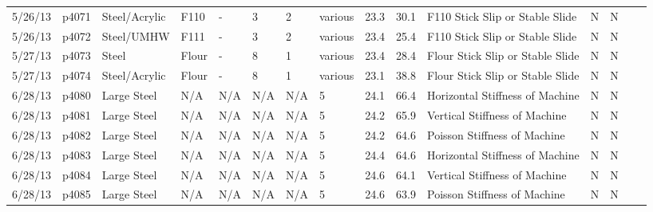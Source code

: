 \begin{landscape}
\begin{longtable}{lllllllllllllll}
5/26/13  & p4071      & Steel/Acrylic    & F110         & -            & 3         & 2             & various                      & 23.3        & 30.1     & F110 Stick Slip or Stable Slide                 & N     & N    &  &  \\
5/26/13  & p4072      & Steel/UMHW       & F111         & -            & 3         & 2             & various                      & 23.4        & 25.4     & F110 Stick Slip or Stable Slide                 & N     & N    &  &  \\
5/27/13  & p4073      & Steel            & Flour        & -            & 8         & 1             & various                      & 23.4        & 28.4     & Flour Stick Slip or Stable Slide                & N     & N    &  &  \\
5/27/13  & p4074      & Steel/Acrylic    & Flour        & -            & 8         & 1             & various                      & 23.1        & 38.8     & Flour Stick Slip or Stable Slide                & N     & N    &  &  \\
6/28/13  & p4080      & Large Steel      & N/A          & N/A          & N/A       & N/A           & 5                            & 24.1        & 66.4     & Horizontal Stiffness of Machine                 & N     & N    &  &  \\
6/28/13  & p4081      & Large Steel      & N/A          & N/A          & N/A       & N/A           & 5                            & 24.2        & 65.9     & Vertical Stiffness of Machine                   & N     & N    &  &  \\
6/28/13  & p4082      & Large Steel      & N/A          & N/A          & N/A       & N/A           & 5                            & 24.2        & 64.6     & Poisson Stiffness of Machine                    & N     & N    &  &  \\
6/28/13  & p4083      & Large Steel      & N/A          & N/A          & N/A       & N/A           & 5                            & 24.4        & 64.6     & Horizontal Stiffness of Machine                 & N     & N    &  &  \\
6/28/13  & p4084      & Large Steel      & N/A          & N/A          & N/A       & N/A           & 5                            & 24.6        & 64.1     & Vertical Stiffness of Machine                   & N     & N    &  &  \\
6/28/13  & p4085      & Large Steel      & N/A          & N/A          & N/A       & N/A           & 5                            & 24.6        & 63.9     & Poisson Stiffness of Machine                    & N     & N    &  &  \\

\end{longtable}
\end{landscape}
